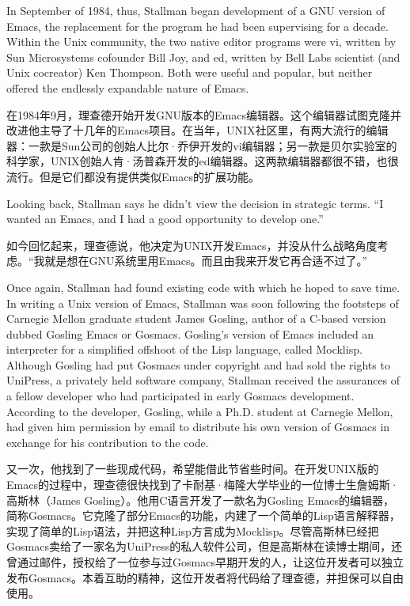 \ifdefined\eng
In September of 1984, thus, Stallman began development of a GNU version of Emacs, the replacement for the program he had been supervising for a decade. Within the Unix community, the two native editor programs were vi, written by Sun Microsystems cofounder Bill Joy, and ed, written by Bell Labs scientist (and Unix cocreator) Ken Thompson. Both were useful and popular, but neither offered the endlessly expandable nature of Emacs.
\fi

\ifdefined\chs
在1984年9月，理查德开始开发GNU版本的Emacs编辑器。这个编辑器试图克隆并改进他主导了十几年的Emacs项目。在当年，UNIX社区里，有两大流行的编辑器：一款是Sun公司的创始人比尔·乔伊开发的vi编辑器；另一款是贝尔实验室的科学家，UNIX创始人肯·汤普森开发的ed编辑器。这两款编辑器都很不错，也很流行。但是它们都没有提供类似Emacs的扩展功能。
\fi

\ifdefined\eng
Looking back, Stallman says he didn't view the decision in strategic terms. ``I wanted an Emacs, and I had a good opportunity to develop one.''
\fi

\ifdefined\chs
如今回忆起来，理查德说，他决定为UNIX开发Emacs，并没从什么战略角度考虑。``我就是想在GNU系统里用Emacs。而且由我来开发它再合适不过了。''
\fi

\ifdefined\eng
Once again, Stallman had found existing code with which he hoped to save time. In writing a Unix version of Emacs, Stallman was soon following the footsteps of Carnegie Mellon graduate student James Gosling, author of a C-based version dubbed Gosling Emacs or Gosmacs. Gosling's version of Emacs included an interpreter for a simplified offshoot of the Lisp language, called Mocklisp. Although Gosling had put Gosmacs under copyright and had sold the rights to UniPress, a privately held software company, Stallman received the assurances of a fellow developer who had participated in early Gosmacs development. According to the developer, Gosling, while a Ph.D. student at Carnegie Mellon, had given him permission by email to distribute his own version of Gosmacs in exchange for his contribution to the code.
\fi

\ifdefined\chs
又一次，他找到了一些现成代码，希望能借此节省些时间。在开发UNIX版的Emacs的过程中，理查德很快找到了卡耐基·梅隆大学毕业的一位博士生詹姆斯·高斯林（James Gosling）。他用C语言开发了一款名为Gosling Emacs的编辑器，简称Gosmacs。它克隆了部分Emacs的功能，内建了一个简单的Lisp语言解释器，实现了简单的Lisp语法，并把这种Lisp方言成为Mocklisp。尽管高斯林已经把Gosmacs卖给了一家名为UniPress的私人软件公司，但是高斯林在读博士期间，还曾通过邮件，授权给了一位参与过Gosmacs早期开发的人，让这位开发者可以独立发布Gosmacs。本着互助的精神，这位开发者将代码给了理查德，并担保可以自由使用。
\fi

